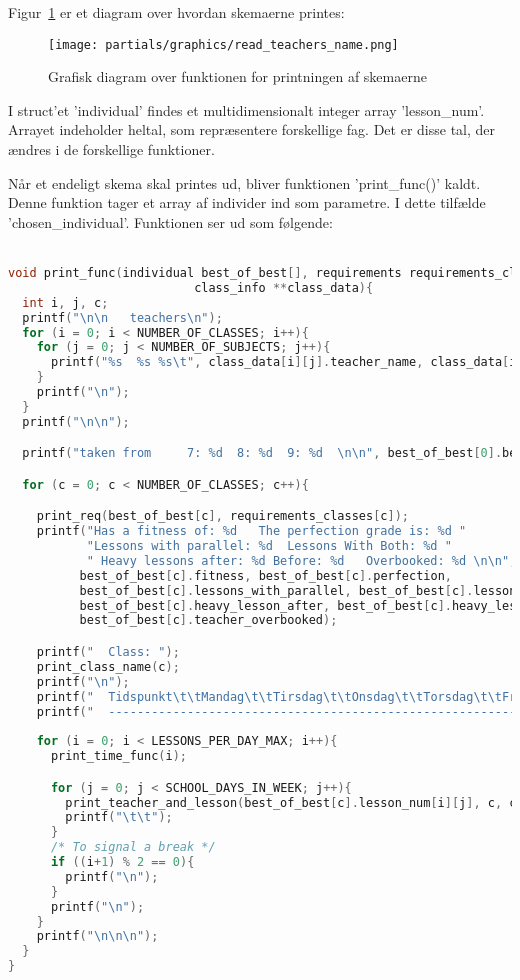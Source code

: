 Figur~\ref{fig:diagramprint} er et diagram over hvordan skemaerne printes:
\begin{figure}[!ht]
\texttt{[image: partials/graphics/read\_teachers\_name.png]}
\caption{Grafisk diagram over funktionen for printningen af skemaerne}
\label{fig:diagramprint}
\end{figure}

I struct’et ’individual’ findes et multidimensionalt integer array ’lesson\_num’. Arrayet indeholder heltal, som repræsentere forskellige fag. Det er disse tal, der ændres i de forskellige funktioner. 

Når et endeligt skema skal printes ud, bliver funktionen ’print\_func()’ kaldt. Denne funktion tager et array af individer ind som parametre. I dette tilfælde ’chosen\_individual’. Funktionen ser ud som følgende:
\\\\
\begin{lstlisting}[showstringspaces=false,language = C]
void print_func(individual best_of_best[], requirements requirements_classes[],
                          class_info **class_data){
  int i, j, c;
  printf("\n\n   teachers\n");
  for (i = 0; i < NUMBER_OF_CLASSES; i++){
    for (j = 0; j < NUMBER_OF_SUBJECTS; j++){
      printf("%s  %s %s\t", class_data[i][j].teacher_name, class_data[i][j].lesson_name, class_data[i][j].class_name);
    }
    printf("\n");
  }
  printf("\n\n");

  printf("taken from     7: %d  8: %d  9: %d  \n\n", best_of_best[0].best_gena7, best_of_best[0].best_gena8, best_of_best[0].best_gena9);

  for (c = 0; c < NUMBER_OF_CLASSES; c++){

    print_req(best_of_best[c], requirements_classes[c]);
    printf("Has a fitness of: %d   The perfection grade is: %d "
           "Lessons with parallel: %d  Lessons With Both: %d " 
           " Heavy lessons after: %d Before: %d   Overbooked: %d \n\n", 
          best_of_best[c].fitness, best_of_best[c].perfection, 
          best_of_best[c].lessons_with_parallel, best_of_best[c].lessons_with_both, 
          best_of_best[c].heavy_lesson_after, best_of_best[c].heavy_lesson_before, 
          best_of_best[c].teacher_overbooked);

    printf("  Class: ");
    print_class_name(c);
    printf("\n");
    printf("  Tidspunkt\t\tMandag\t\tTirsdag\t\tOnsdag\t\tTorsdag\t\tFredag\n");
    printf("  ------------------------------------------------------------------------------------------------\n");
    
    for (i = 0; i < LESSONS_PER_DAY_MAX; i++){
      print_time_func(i);

      for (j = 0; j < SCHOOL_DAYS_IN_WEEK; j++){
        print_teacher_and_lesson(best_of_best[c].lesson_num[i][j], c, class_data);
        printf("\t\t");
      }
      /* To signal a break */
      if ((i+1) % 2 == 0){
        printf("\n");
      }
      printf("\n");
    }
    printf("\n\n\n");
  }
}
\end{lstlisting}

